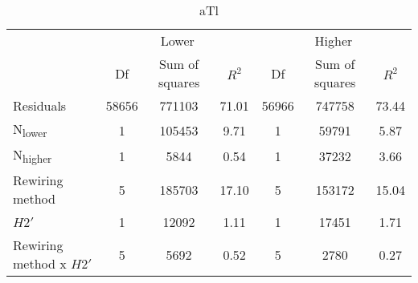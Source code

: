 \documentclass[12pt,a4paper]{article}
\begin{document}
\begin{table}[H]
\medskip
\begin{subtable}{\linewidth}
\caption{aTl}
\centering
\begin{tabularx}{\linewidth}{@{} X *6{c} @{}}
\toprule
  & \multicolumn{3}{c}{Lower} & \multicolumn{3}{c}{Higher} \\ \cmidrule(l){2-4} \cmidrule(l){5-7}
  						& Df		& Sum of squares	& $R^2$	& Df 	& Sum of squares	& $R^2$ \\ \midrule
Residuals 				& 58656 & 771103		& 71.01	& 56966 & 747758		& 73.44   \\
N\textsubscript{lower} 	& 1 		& 105453 		& 9.71 	& 1		& 59791			& 5.87  \\
N\textsubscript{higher} 	& 1 		& 5844 			& 0.54	& 1 		& 37232		& 3.66  \\
Rewiring method 			& 5 		& 185703 		& 17.10 	& 5 		& 153172		& 15.04  \\
$H2'$ 					& 1 		& 12092 			& 1.11 	& 1 		& 17451			& 1.71 \\
Rewiring method x $H2'$ 	& 5 		& 5692 			& 0.52 	& 5 		& 2780			& 0.27  \\ \bottomrule
\end{tabularx}

\end{subtable}
\end{table}

\end{document}
